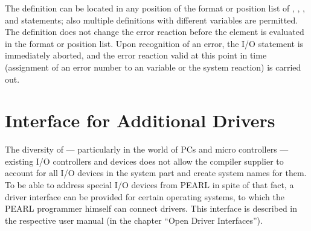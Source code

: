 The  definition can be located in any position of the format or
position list of , , ,  and  statements; also
multiple definitions with different variables are permitted. The 
definition does not change the error reaction before the  element is
evaluated in the format or position list. Upon recognition of an error,
the I/O statement is immediately aborted, and the error reaction valid
at this point in time (assignment of an error number to an  variable
or the system reaction) is carried out.

\section{Interface for Additional Drivers}   %
\label{sec_driver_interface}

The diversity of --- particularly in the world of PCs 
and micro controllers --- existing I/O
controllers and devices does not allow the compiler supplier to account
for all I/O devices in the system part and create system names for them.
To be able to address special I/O devices from PEARL in spite of that
fact, a driver interface can be provided for certain operating systems,
to which the PEARL programmer himself can connect drivers. This
interface is described in the respective user manual (in the chapter
``Open Driver Interfaces'').

